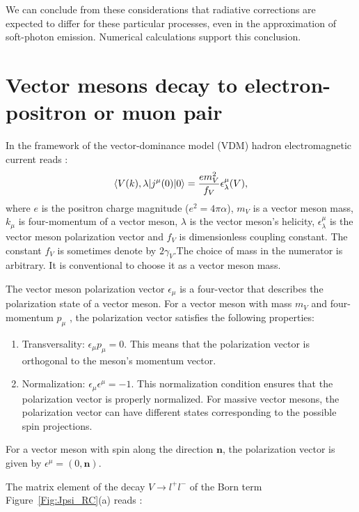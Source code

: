 \documentclass[prd,onecolumn,showpcs,amsmath,amssymb,nofootinbib,notitlepage,preprintnumbers,balancelastpage,longbibliography]{revtex4-2}
\begin{document}
We can conclude from these considerations that radiative corrections are expected to differ for these particular processes, even in the approximation of soft-photon emission. Numerical calculations support this conclusion. 


\section{Vector mesons decay to electron-positron or muon pair}
In the framework of the vector-dominance model (VDM) hadron electromagnetic current  reads \cite{Chavin1976}:
\begin{equation}
\braket{V(k),\lambda | j^\mu(0)| 0}=\frac{em_V^2}{f_V}\epsilon^\mu_\lambda(V),
\end{equation}
\noindent
where 
$e$ is the positron charge magnitude ($e^2=4\pi\alpha$),
$m_V$ is a vector meson mass, 
$k_\mu$ is four-momentum of a vector meson,
$\lambda$ is the vector meson's helicity,
$\epsilon^\mu_\lambda$ is the vector meson polarization vector and 
$f_V$ is dimensionless coupling constant. 
The constant $f_V$ is sometimes denote by $2\gamma_V$.The choice of mass in the numerator is arbitrary. It is conventional to choose it as a vector meson mass. 

The vector meson polarization vector $\epsilon_\mu$  is a four-vector that describes the polarization state of a vector meson. 
For a vector meson with mass $m_V$  and four-momentum $p_\mu$ , the polarization vector   satisfies the following properties:
\begin{enumerate}
\item Transversality: $ \epsilon_\mu p_\mu = 0$.
    This means that the polarization vector is orthogonal to the meson's momentum vector.
    
\item Normalization: $ \epsilon_\mu \epsilon^\mu = -1$.
    This normalization condition ensures that the polarization vector is properly normalized. For massive vector mesons, the polarization vector can have different states corresponding to the possible spin projections.
\end{enumerate}
For a vector meson with spin along the direction \(\mathbf{n}\), the polarization vector is given by \(\epsilon^\mu=(0,\mathbf{n})\).

\noindent
The matrix element of the decay $V \to l^+l^-$ of the Born term Figure~\ref{Fig:Jpsi_RC}(a)  reads \cite{Balitsky2024}:
\end{document}
